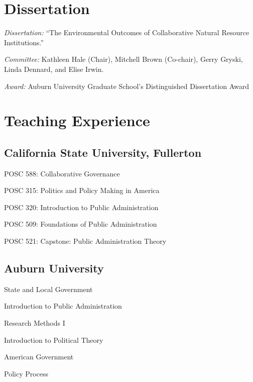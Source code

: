 \documentclass[12pt,letterpaper]{article}
\renewenvironment{itemize}{
  \begin{list}{}{
    \setlength{\leftmargin}{1.5em}
    \setlength{\itemsep}{0.25em}
    \setlength{\parskip}{0pt}
    \setlength{\parsep}{0.25em}
  }
}{
  \end{list}
}
\begin{document}
\section*{Dissertation}
    \begin{itemize}\leftmargin=2pt\itemindent=-15pt\leftmargin=2pt\itemindent=-15pt
        \item \emph{Dissertation:} ``The Environmental Outcomes of Collaborative Natural Resource Institutions.'' 
        \item \emph{Committee:} Kathleen Hale (Chair), Mitchell Brown (Co-chair),
        Gerry Gryski, \\Linda Dennard, and Elise Irwin.
        \item \emph{Award:} Auburn University Graduate School's Distinguished Dissertation Award
    \end{itemize}
		
\section*{Teaching Experience}

\subsection*{California State University, Fullerton}
\begin{itemize}\leftmargin=2pt\itemindent=-15pt
  \item POSC 588: Collaborative Governance
  \item POSC 315: Politics and Policy Making in America
  \item POSC 320: Introduction to Public Administration
  \item POSC 509: Foundations of Public Administration
  \item POSC 521: Capstone: Public Administration Theory
\end{itemize}

\subsection*{Auburn University}
\begin{itemize}\leftmargin=2pt\itemindent=-15pt
  \item State and Local Government
  \item Introduction to Public Administration
  \item Research Methods I
  \item Introduction to Political Theory
  \item American Government
  \item Policy Process
\end{itemize}
\end{document}
